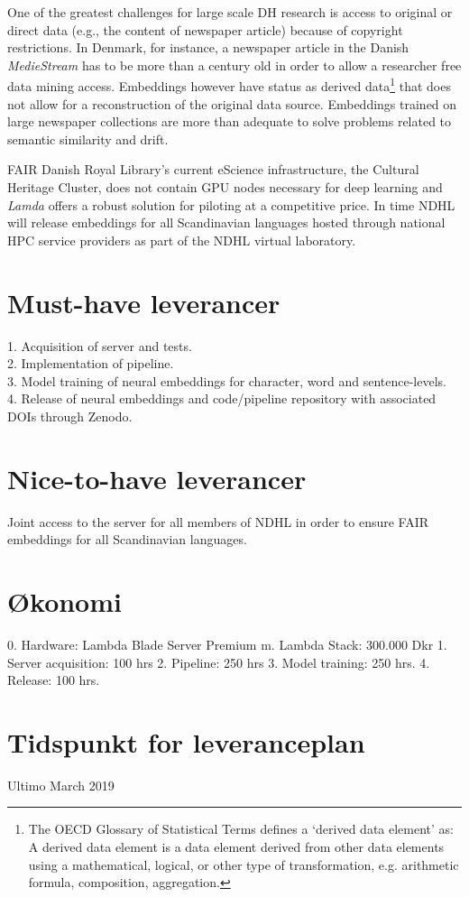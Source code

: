 \documentclass[12pt,a4paper]{article}
\begin{document}
One of the greatest challenges for large scale DH research is access to original or direct data (e.g., the content of newspaper article) because of copyright restrictions. In Denmark, for instance, a newspaper article in the Danish \textit{MedieStream} has to be more than a century old in order to allow a researcher free data mining access. Embeddings however have status as derived data\footnote{The OECD Glossary of Statistical Terms defines a `derived data element' as: A derived data element is a data element derived from other data elements using a mathematical, logical, or other type of transformation, e.g. arithmetic formula, composition, aggregation.} that does not allow for a reconstruction of the original data source. Embeddings trained on large newspaper collections are more than adequate to solve problems related to semantic similarity and drift.

FAIR Danish Royal Library's current eScience infrastructure, the Cultural Heritage Cluster, does not contain GPU nodes necessary for deep learning and \textit{Lamda} offers a robust solution for piloting at a competitive price. In time NDHL will release embeddings for all Scandinavian languages hosted through national HPC service providers as part of the NDHL virtual laboratory.

\section*{Must-have leverancer}
1. Acquisition of server and tests.\\
2. Implementation of pipeline.\\
3. Model training of neural embeddings for character, word and sentence-levels.\\
4. Release of neural embeddings and code/pipeline repository with associated DOIs through Zenodo.\\
\section*{Nice-to-have leverancer}
Joint access to the server for all members of NDHL in order to ensure FAIR embeddings for all Scandinavian languages.

\section*{Økonomi}
0. Hardware: Lambda Blade Server Premium m. Lambda Stack: 300.000 Dkr
1. Server acquisition: 100 hrs
2. Pipeline: 250 hrs
3. Model training: 250 hrs.
4. Release: 100 hrs.

\section*{Tidspunkt for leveranceplan}
Ultimo March 2019
\end{document}
